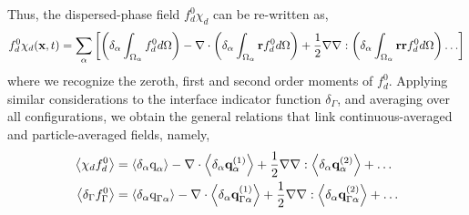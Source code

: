 Thus, the dispersed-phase field $f_d^0\chi_d$ can be re-written as, 
\begin{equation*}
    f^0_d \chi_d(\textbf{x},t)
    = \sum_\alpha \left[
          \left(\delta_\alpha\int_{\Omega_{\alpha}} f^0_d d\Omega\right)
        - \mathbf{\nabla}\cdot\left(\delta_\alpha\int_{\Omega_{\alpha}} \textbf{r} f^0_d d\Omega\right)
        + \frac{1}{2}\mathbf{\nabla}\mathbf{\nabla} :\left(\delta_\alpha\int_{\Omega_{\alpha}} \textbf{rr} f^0_d d\Omega\right)
        \ldots
    \right]
\end{equation*}
where we recognize the zeroth, first and second order moments of $f_d^0$. 
Applying similar considerations to the interface indicator function $\delta_\Gamma$, and averaging over all configurations, we obtain the general relations that link continuous-averaged and particle-averaged fields, namely, 
\begin{align}
    \left<\chi_df_d^0\right> 
    &=  \left<\delta_\alpha \text q_\alpha\right>
        - \mathbf{\nabla}\cdot  
        \left<\delta_\alpha \textbf{q}_\alpha^{(1)}\right>        
        + \frac{1}{2} \mathbf{\nabla}\mathbf{\nabla} : \left<\delta_\alpha \textbf{q}_{\alpha}^{(2)}\right>
        + \ldots  
        \nonumber\\
    \left<\delta_\Gamma  f_\Gamma ^0\right> 
    &=  \left<\delta_\alpha \text q_{\Gamma \alpha}\right>        
        - \mathbf{\nabla}\cdot \left<\delta_\alpha \textbf{q}_{\Gamma\alpha}^{(1)}\right>
        + \frac{1}{2} \mathbf{\nabla}\mathbf{\nabla} : \left<\delta_\alpha \textbf{q}_{\Gamma\alpha}^{(2)}\right>
        + \ldots  
    \label{eq:f_exp}
\end{align}

